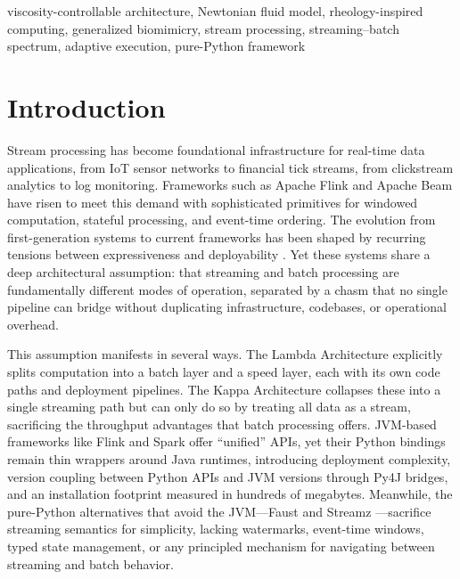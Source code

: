 \documentclass[conference]{IEEEtran}
\begin{document}
\begin{IEEEkeywords}
viscosity-controllable architecture, Newtonian fluid model, rheology-inspired computing, generalized biomimicry, stream processing, streaming--batch spectrum, adaptive execution, pure-Python framework
\end{IEEEkeywords}

\section{Introduction}

Stream processing has become foundational infrastructure for real-time data applications, from IoT sensor networks to financial tick streams, from clickstream analytics to log monitoring. Frameworks such as Apache Flink \cite{carbone2015flink} and Apache Beam \cite{beam2016} have risen to meet this demand with sophisticated primitives for windowed computation, stateful processing, and event-time ordering. The evolution from first-generation systems to current frameworks has been shaped by recurring tensions between expressiveness and deployability \cite{fragkoulis2020survey}. Yet these systems share a deep architectural assumption: that streaming and batch processing are fundamentally different modes of operation, separated by a chasm that no single pipeline can bridge without duplicating infrastructure, codebases, or operational overhead.

This assumption manifests in several ways. The Lambda Architecture explicitly splits computation into a batch layer and a speed layer, each with its own code paths and deployment pipelines. The Kappa Architecture collapses these into a single streaming path but can only do so by treating all data as a stream, sacrificing the throughput advantages that batch processing offers. JVM-based frameworks like Flink and Spark offer ``unified'' APIs, yet their Python bindings remain thin wrappers around Java runtimes, introducing deployment complexity, version coupling between Python APIs and JVM versions through Py4J bridges, and an installation footprint measured in hundreds of megabytes. Meanwhile, the pure-Python alternatives that avoid the JVM---Faust \cite{faust2018} and Streamz \cite{streamz2019}---sacrifice streaming semantics for simplicity, lacking watermarks, event-time windows, typed state management, or any principled mechanism for navigating between streaming and batch behavior.
\end{document}
